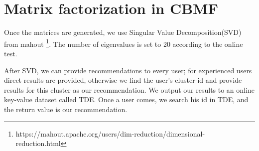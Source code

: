 \section{Matrix factorization in CBMF}

Once the matrices are generated, we use Singular Value Decomposition(SVD) from mahout \footnote{https://mahout.apache.org/users/dim-reduction/dimensional-reduction.html}. The number of eigenvalues is set to 20 according to the online test.

After SVD, we can provide recommendations to every user; for experienced users direct results are provided, otherwise we find the user's cluster-id and provide results for this cluster as our recommendation. We output our results to an online key-value dataset called TDE. Once a user comes, we search his id in TDE, and the return value is our recommendation.


